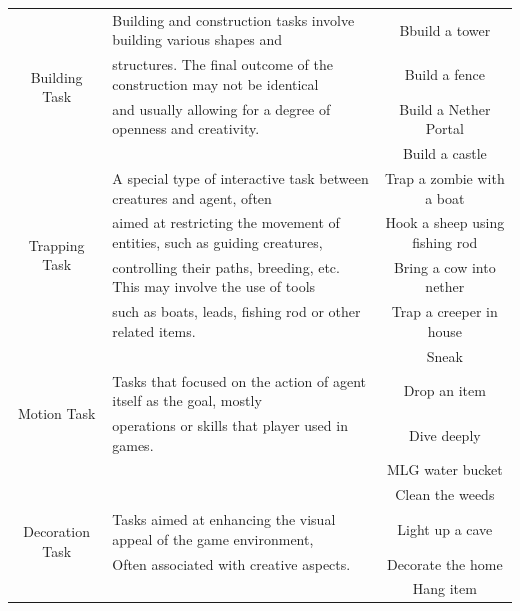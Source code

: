 \begin{table}[h]
{\begin{tabular}{c|l|c}

    \multirow{4}{*}{Building Task} 
    &  Building and construction tasks involve building various shapes and 
    & Bbuild a tower\\
    & structures. The final outcome of the construction may not be identical
    & Build a fence\\
    & and usually allowing for a degree of openness and creativity.
    & Build a Nether Portal\\
    & 
    & Build a castle\\
    \hline

    \multirow{4}{*}{Trapping Task} 
    &  A special type of interactive task between creatures and agent, often 
    & Trap a zombie with a boat\\
    & aimed at restricting  the movement of entities, such as guiding creatures,
    & Hook a sheep using fishing rod\\
    &  controlling their paths, breeding, etc. This may involve the use of tools
    & Bring a cow into nether\\
    &  such as boats, leads, fishing rod or other related items.
    & Trap a creeper in house\\
    \hline

    \multirow{4}{*}{Motion Task} 
    &  
    & Sneak\\
    & Tasks that focused on the action of agent itself as the goal, mostly 
    & Drop an item\\
    &  operations or skills that player used in games.
    & Dive deeply \\
    & 
    & MLG water bucket\\
    \hline

    \multirow{4}{*}{Decoration Task} 
    &  
    & Clean the weeds\\
    & Tasks aimed at enhancing the visual appeal of the game environment, 
    & Light up a cave\\
    & Often associated with creative aspects.
    & Decorate the home \\
    & 
    & Hang item\\
    \hline
    
  \end{tabular}}
\end{table}

